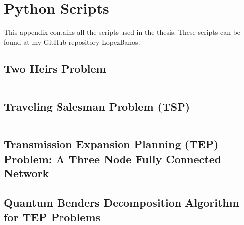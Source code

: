 
\chapter{Python Scripts} %

This appendix contains all the scripts used in the thesis. These scripts can be found at my GitHub repository LopezBanos.
\label{AppendixD} %
\section{Two Heirs Problem}
\inputminted[linenos]{python}{Scripts/Two_Heirs.py}
\section{Traveling Salesman Problem (TSP)}
\inputminted[linenos]{python}{Scripts/tsp_simulated_annealing.py}
\section{Transmission Expansion Planning (TEP) Problem: A Three Node Fully Connected Network}
\section{Quantum Benders Decomposition Algorithm for TEP Problems}